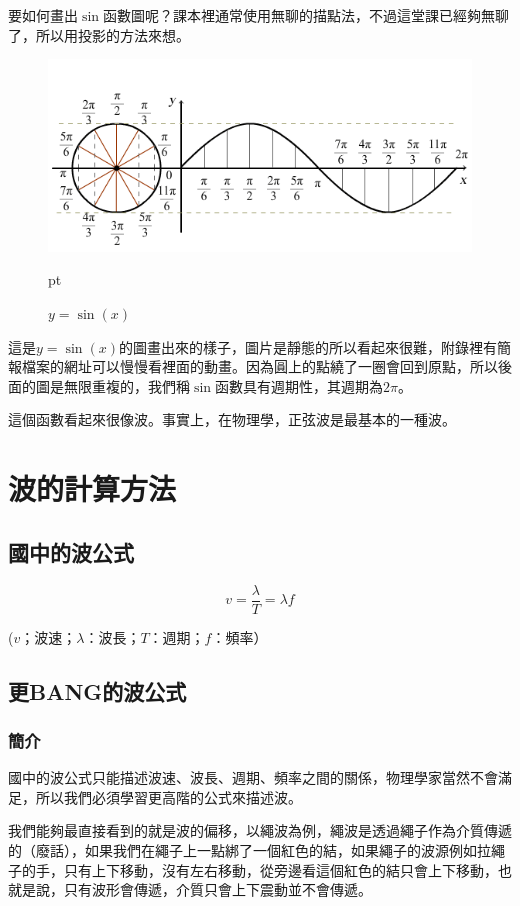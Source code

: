 要如何畫出$\sin$函數圖呢？課本裡通常使用無聊的描點法，不過這堂課已經夠無聊了，所以用投影的方法來想。

\begin{figure}[H]
\centering
\graphicspath{{physics/}}
\includegraphics[width=\textwidth, center]{sin-wave.png}
\caption{$y=\sin (x)$}  pt
\label{fig:sin-wave}
\end{figure}

這是$y=\sin⁡ (x)$的圖畫出來的樣子，圖片是靜態的所以看起來很難，附錄裡有簡報檔案的網址可以慢慢看裡面的動畫。因為圓上的點繞了一圈會回到原點，所以後面的圖是無限重複的，我們稱$\sin$函數具有週期性，其週期為$2\pi$。

這個函數看起來很像波。事實上，在物理學，正弦波是最基本的一種波。

\section{波的計算方法}

\subsection{國中的波公式}
$$v=\frac{\lambda}{T}=\lambda f$$
\begin{center}
($v$；波速；$\lambda$：波長；$T$：週期；$f$：頻率）
\end{center}
\subsection{更BANG的波公式}
\subsubsection{簡介}
國中的波公式只能描述波速、波長、週期、頻率之間的關係，物理學家當然不會滿足，所以我們必須學習更高階的公式來描述波。

我們能夠最直接看到的就是波的偏移，以繩波為例，繩波是透過繩子作為介質傳遞的（廢話），如果我們在繩子上一點綁了一個紅色的結，如果繩子的波源例如拉繩子的手，只有上下移動，沒有左右移動，從旁邊看這個紅色的結只會上下移動，也就是說，只有波形會傳遞，介質只會上下震動並不會傳遞。

